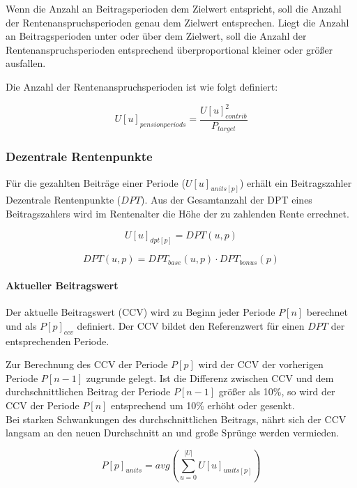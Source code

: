 Wenn die Anzahl an Beitragsperioden dem Zielwert entspricht, soll die Anzahl der 
Rentenanspruchsperioden genau dem Zielwert entsprechen. Liegt die  Anzahl an
Beitragsperioden unter oder über dem Zielwert, soll die Anzahl der 
Rentenanspruchsperioden entsprechend überproportional kleiner oder größer ausfallen.  

Die Anzahl der Rentenanspruchsperioden ist wie folgt definiert:

\begin{equation}
U[u]_{pensionperiods} = \frac{U[u]_{contrib}^2}{P_{target}}
\end{equation}


\subsubsection*{Dezentrale Rentenpunkte}
Für die gezahlten Beiträge einer Periode ($U[u]_{units[p]}$) erhält ein Beitragszahler Dezentrale Rentenpunkte
($DPT$). Aus der Gesamtanzahl der DPT eines Beitragszahlers wird im Rentenalter
die Höhe der zu zahlenden Rente errechnet.

\begin{equation}
U[u]_{dpt[p]} = DPT(u, p)
\end{equation}

\begin{equation}
DPT(u, p) = DPT_{base}(u, p) \cdot DPT_{bonus}(p)
\end{equation}

\paragraph*{Aktueller Beitragswert}
Der aktuelle Beitragswert (CCV) wird zu Beginn jeder Periode 
$P[n]$ berechnet und als $P[p]_{ccv}$ definiert. Der CCV bildet den Referenzwert für einen $DPT$ der
entsprechenden Periode.

Zur Berechnung des CCV der Periode $P[p]$ wird der CCV der vorherigen
Periode $P[n-1]$ zugrunde gelegt. Ist die Differenz zwischen CCV und dem
durchschnittlichen Beitrag der Periode $P[n-1]$ größer als 10\%, so wird
der CCV der Periode $P[n]$ entsprechend um 10\% erhöht oder gesenkt.\\
Bei starken Schwankungen des durchschnittlichen Beitrags, nährt sich der CCV langsam an den neuen Durchschnitt an und große Sprünge werden vermieden.


\begin{equation}
P[p]_{units} = avg(\sum_{u=0}^{|U|} U[u]_{units[p]})
\end{equation}

